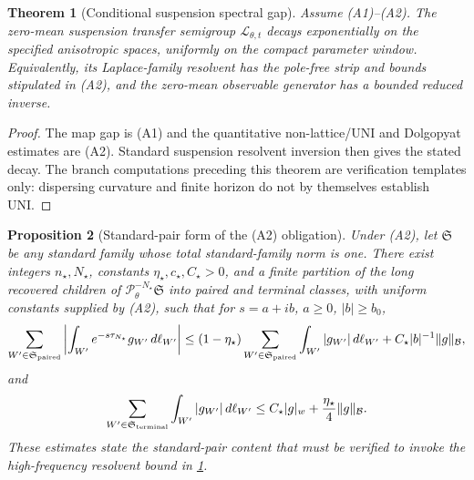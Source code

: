 \documentclass[12pt, letterpaper]{amsart}
\newcommand{\Bcal}{\mathcal{B}}
\newcommand{\Pcal}{\mathcal{P}}
\theoremstyle{plain}
\newtheorem{theorem}{Theorem}[section]
\newtheorem{proposition}[theorem]{Proposition}
\theoremstyle{definition}
\theoremstyle{remark}
\begin{document}
\begin{theorem}[Conditional suspension spectral gap]
\label{thm:flow_spectral_gap}
Assume \textup{(A1)--(A2)}. The zero-mean suspension transfer semigroup
$\mathscr{L}_{\theta,t}$ decays exponentially on the specified anisotropic
spaces, uniformly on the compact parameter window. Equivalently, its
Laplace-family resolvent has the pole-free strip and bounds stipulated in
\textup{(A2)}, and the zero-mean observable generator has a bounded reduced
inverse.
\end{theorem}

\begin{proof}
The map gap is \textup{(A1)} and the quantitative non-lattice/UNI and
Dolgopyat estimates are \textup{(A2)}. Standard suspension resolvent inversion
then gives the stated decay. The branch computations preceding this theorem
are verification templates only: dispersing curvature and finite horizon do
not by themselves establish UNI.
\end{proof}



\begin{proposition}[Standard-pair form of the \textup{(A2)} obligation]
\label{prop:constant_level_dolgopyat_induction}
Under \textup{(A2)}, let \(\mathfrak S\) be any standard family whose total standard-family norm is
one.  There exist integers \(n_\star,N_\star\), constants
\(\eta_\star,c_\star,C_\star>0\), and a finite partition of the long recovered
children of \(\Pcal_\theta^{-N_\star}\mathfrak S\) into paired and terminal
classes, with uniform constants supplied by \textup{(A2)}, such that for
\(s=a+ib\), \(a\ge0\), \(|b|\ge b_0\),
\begin{equation}
\label{eq:standard_pair_dolgopyat_induction_bound}
    \sum_{W'\in\mathfrak S_{\rm paired}}
       \left|\int_{W'} e^{-s\tau_{N_\star}}g_{W'}\,d\ell_{W'}\right|
    \le (1-\eta_\star)
       \sum_{W'\in\mathfrak S_{\rm paired}}
       \int_{W'} |g_{W'}|\,d\ell_{W'}
       +C_\star |b|^{-1}\|g\|_{\Bcal},
\end{equation}
and
\begin{equation}
\label{eq:terminal_dolgopyat_tail_bound}
    \sum_{W'\in\mathfrak S_{\rm terminal}}
       \int_{W'} |g_{W'}|\,d\ell_{W'}
    \le C_\star |g|_{w}+\frac{\eta_\star}{4}\|g\|_{\Bcal} .
\end{equation}
These estimates state the standard-pair content that must be verified to invoke
the high-frequency resolvent bound in \cref{thm:flow_spectral_gap}.
\end{proposition}
\end{document}
